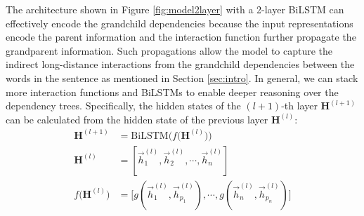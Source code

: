The architecture shown in Figure \ref{fig:model2layer} with a 2-layer BiLSTM can effectively encode the grandchild dependencies because the input representations encode the parent information and the interaction function further propagate the grandparent information. 
Such propagations allow the model to capture the indirect long-distance interactions from the grandchild dependencies between the words in the sentence as mentioned in Section \ref{sec:intro}. 
In general, we can stack more interaction functions and BiLSTMs to enable deeper reasoning over the dependency trees. 
Specifically, the hidden states of the $(l+1)$-th layer $\mathbf{H}^{(l+1)}$ can be calculated from the hidden state of the previous layer $\mathbf{H}^{(l)}$:
\begin{equation}
\begin{split}
\mathbf{H}^{(l+1)} & \!   = \!\text{BiLSTM}
\Big ( 
f \big (\mathbf{H}^{(l)} \big )
\Big ) \\
\mathbf{H}^{(l)} & \! = \!\!
\left [
\vec{h}_1^{(l)}, \vec{h}_2^{(l)}, \cdots, \vec{h}_n^{(l)}
\right ] \\
f\big (\mathbf{H}^{(l)} \big ) &\!  = \!\!
\Big [
g (
\vec{h}_1^{(l)}, \vec{h}_{p_1}^{(l)}
), 
\cdots ,
g (
\vec{h}_n^{(l)},\vec{h}_{p_n}^{(l)}
)
\Big ]
\end{split}\nonumber
\end{equation}
